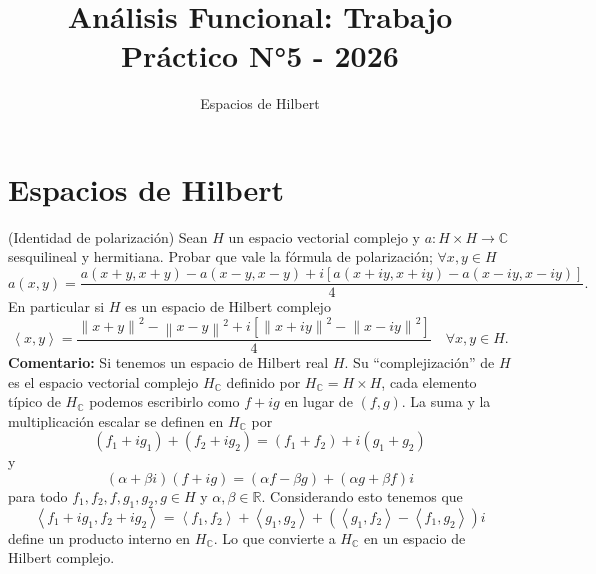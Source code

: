 \documentclass{article}
\theoremstyle{definition}
\newcommand{\R}{\mathbb{R}}
\newcommand{\C}{\mathbb{C}}
\newcommand{\norm}[1]{\left\lVert #1 \right\rVert}       %
\newcommand{\ip}[2]{\left\langle #1, #2 \right\rangle}   %
\newenvironment{ejercicio}[1]{\begin{trivlist}
\item[\hskip \labelsep {\bfseries Ejercicio}\hskip \labelsep {\bfseries #1.}]}{\end{trivlist}}
\begin{document}
\title{Análisis Funcional: Trabajo Práctico N°5 - 2026}
\author{Espacios de Hilbert}
\date{}

\maketitle

\vspace{0.8cm}

\section{Espacios de Hilbert}

\begin{ejercicio}{1}
	(Identidad de polarización) Sean \( H \) un espacio vectorial complejo y \( a: H \times H \to \C \) sesquilineal y hermitiana. Probar que vale la fórmula de polarización; \( \forall x, y \in H \)
	\[
		a(x, y) = \frac{a(x+y, x+y) - a(x-y, x-y) + i \left[ a(x+iy, x+iy) - a(x-iy, x-iy) \right]}{4}.
	\]
	En particular si \( H \) es un espacio de Hilbert complejo
	\[
		\ip{x}{y} = \frac{\norm{x+y}^2 - \norm{x-y}^2 + i \left[ \norm{x+iy}^2 - \norm{x-iy}^2 \right]}{4} \quad \forall x, y \in H.
	\]
	\textbf{Comentario:} Si tenemos un espacio de Hilbert real \( H \). Su ``complejización'' de \( H \) es el espacio vectorial complejo \( H_{\C} \) definido por \( H_{\C} = H \times H \), cada elemento típico de \( H_{\C} \) podemos escribirlo como \( f + ig \) en lugar de \( (f, g) \). La suma y la multiplicación escalar se definen en \( H_{\C} \) por
	\[ (f_1 + ig_1) + (f_2 + ig_2) = (f_1 + f_2) + i(g_1 + g_2) \]
	y
	\[ (\alpha + \beta i)(f + ig) = (\alpha f - \beta g) + (\alpha g + \beta f)i \]
	para todo \( f_1, f_2, f, g_1, g_2, g \in H \) y \( \alpha, \beta \in \R \). Considerando esto tenemos que
	\[ \ip{f_1 + ig_1}{f_2 + ig_2} = \ip{f_1}{f_2} + \ip{g_1}{g_2} + (\ip{g_1}{f_2} - \ip{f_1}{g_2})i \]
	define un producto interno en \( H_{\C} \). Lo que convierte a \( H_{\C} \) en un espacio de Hilbert complejo.
\end{ejercicio}
\end{document}
